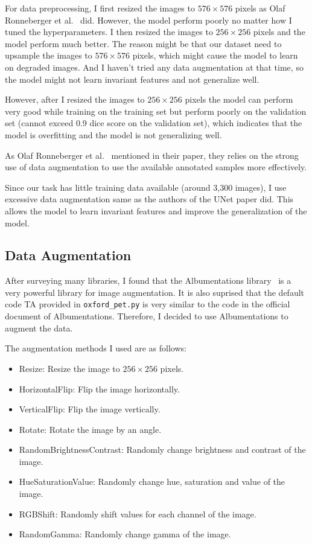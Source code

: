 For data preprocessing, I first resized the images to $576 \times 576$ pixels as Olaf Ronneberger et al.~\cite{UNet} did.
However, the model perform poorly no matter how I tuned the hyperparameters.
I then resized the images to $256 \times 256$ pixels and the model perform much better.
The reason might be that our dataset need to upsample the images to $576 \times 576$ pixels, which might cause the model to learn on degraded images.
And I haven't tried any data augmentation at that time, so the model might not learn invariant features and not generalize well.

However, after I resized the images to $256 \times 256$ pixels the model can perform very good while training on the training set but perform poorly on the validation set (cannot exceed 0.9 dice score on the validation set), which indicates that the model is overfitting and the model is not generalizing well.

As Olaf Ronneberger et al.~\cite{UNet} mentioned in their paper, they relies on the strong use of data augmentation to use the available annotated samples more effectively.

Since our task has little training data available (around 3,300 images), I use excessive data augmentation same as the authors of the UNet paper did.
This allows the model to learn invariant features and improve the generalization of the model.

\subsection{Data Augmentation}

After surveying many libraries, I found that the Albumentations library~\cite{Albumentations} is a very powerful library for image augmentation.
It is also suprised that the default code TA provided in \texttt{oxford\_pet.py} is very similar to the code in the official document of Albumentations.
Therefore, I decided to use Albumentations to augment the data.

The augmentation methods I used are as follows:

\begin{itemize}
    \item Resize: Resize the image to $256 \times 256$ pixels.
    \item HorizontalFlip: Flip the image horizontally.
    \item VerticalFlip: Flip the image vertically.
    \item Rotate: Rotate the image by an angle.
    \item RandomBrightnessContrast: Randomly change brightness and contrast of the image.
    \item HueSaturationValue: Randomly change hue, saturation and value of the image.
    \item RGBShift: Randomly shift values for each channel of the image.
    \item RandomGamma: Randomly change gamma of the image.
\end{itemize}


